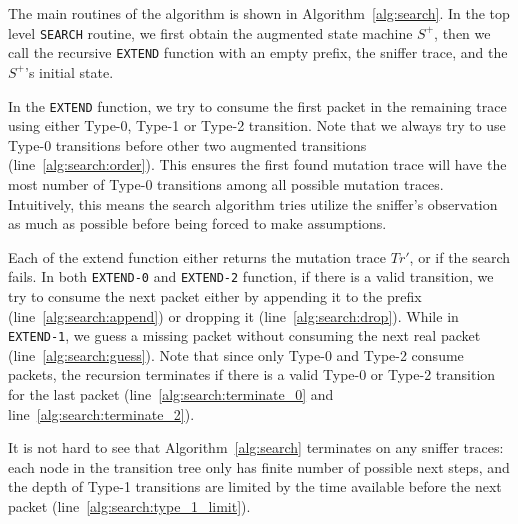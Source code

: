 The main routines of the algorithm is shown in Algorithm~\ref{alg:search}.
In the top level \texttt{SEARCH} routine, we first obtain the augmented state
machine $S^+$, then we call the recursive \texttt{EXTEND} function with an empty
prefix, the sniffer trace, and the $S^+$'s initial state.

In the \texttt{EXTEND} function, we try to consume the first packet in the
remaining trace using either Type-0, Type-1 or Type-2 transition.
Note that we always try to use Type-0 transitions before other two augmented
transitions (line~\ref{alg:search:order}).
This ensures the first found mutation trace will have the most number of Type-0
transitions among all possible mutation traces.
Intuitively, this means the search algorithm tries utilize the sniffer's
observation as much as possible before being forced to make assumptions.


Each of the extend function either returns the mutation trace $Tr'$, or
\textit{\nil} if the search fails.
In both \texttt{EXTEND-0} and
\texttt{EXTEND-2} function, if there is a valid transition, we try to consume
the next packet either by appending it to the prefix
(line~\ref{alg:search:append}) or dropping it (line~\ref{alg:search:drop}).
While in \texttt{EXTEND-1}, we guess a missing packet without consuming the next
real packet (line~\ref{alg:search:guess}).
Note that since only Type-0 and Type-2 consume packets, the recursion terminates
if there is a valid Type-0 or Type-2 transition for the last packet
(line~\ref{alg:search:terminate_0} and line~\ref{alg:search:terminate_2}).



It is not hard to see that Algorithm~\ref{alg:search} terminates on any sniffer
traces: each node in the transition tree only has finite number of possible next
steps, and the depth of Type-1 transitions are limited by the time available
before the next packet (line~\ref{alg:search:type_1_limit}).
